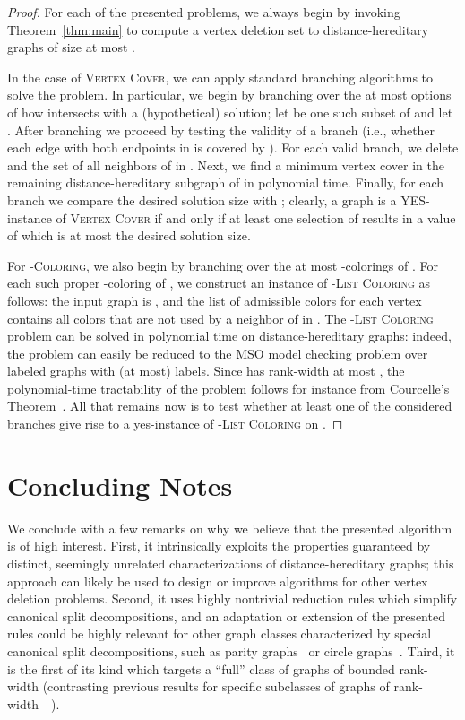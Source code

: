 \documentclass[11pt]{elsarticle}
\begin{document}
\begin{proof}
For each of the presented problems, we always begin by invoking Theorem~\ref{thm:main} to compute a vertex deletion set  to distance-hereditary graphs of size at most .

In the case of \textsc{Vertex Cover}, we can apply standard branching algorithms to solve the problem. In particular, we begin by branching over the at most  options of how  intersects with a (hypothetical) solution; let  be one such subset of  and let . 
After branching we proceed by testing the validity of a branch (i.e., whether each edge with both endpoints in  is covered by ). For each valid branch, we delete  and the set  of all neighbors of  in . Next, we find a minimum vertex cover  in the remaining distance-hereditary subgraph of  in polynomial time. Finally, for each branch we compare the desired solution size with ; clearly, a  graph is a YES-instance of \textsc{Vertex Cover} if and only if at least one selection of  results in a value of  which is at most the desired solution size.

For \textsc{-Coloring}, we also begin by branching over the at most  -colorings of . For each such proper -coloring of , we construct an instance of \textsc{-List Coloring} as follows: the input graph is , and the list of admissible colors for each vertex  contains all colors that are not used by a neighbor of  in . The \textsc{-List Coloring} problem can be solved in polynomial time on distance-hereditary graphs: indeed, the problem can easily be reduced to the MSO model checking problem over labeled graphs with (at most)  labels. Since  has rank-width at most , the polynomial-time tractability of the problem follows for instance from Courcelle's Theorem~\cite{CourcelleMR00}. All that remains now is to test whether at least one of the considered  branches give rise to a yes-instance of \textsc{-List Coloring} on .
\end{proof}


\section{Concluding Notes}
We conclude with a few remarks on why we believe that the presented algorithm is of high interest. First, it intrinsically exploits the properties guaranteed by distinct, seemingly unrelated characterizations of distance-hereditary graphs; this approach can likely be used to design or improve algorithms for other vertex deletion problems. Second, it uses highly nontrivial reduction rules which simplify canonical split decompositions, and an adaptation or extension of the presented rules could be highly relevant for other graph classes characterized by special canonical split decompositions, such as parity graphs~\cite{CiceroneS1999} or circle graphs~\cite{GSH1989}. Third, it is the first of its kind which targets a ``full'' class of graphs of bounded rank-width (contrasting previous results for specific subclasses of graphs of rank-width~~\cite{HuffnerKMN2010, AgrawalKLS16,KimK2015, KanteKKP2015}).
\end{document}
